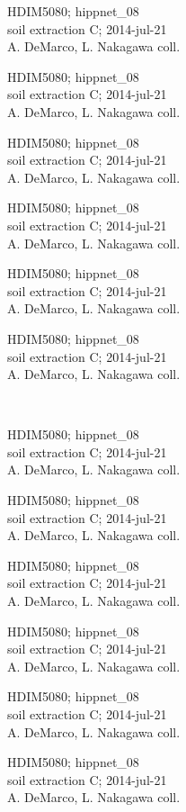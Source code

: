 \documentclass[2pt]{extarticle}
\begin{document}
\noindent
\parbox{0.16\textwidth}{\tiny \raggedright \rule[-0.3\baselineskip]{0pt}{10pt}HDIM5080; hippnet\_08\\ soil extraction C; 2014-jul-21\\ A. DeMarco, L. Nakagawa coll.}
\parbox{0.16\textwidth}{\tiny \raggedright \rule[-0.3\baselineskip]{0pt}{10pt}HDIM5080; hippnet\_08\\ soil extraction C; 2014-jul-21\\ A. DeMarco, L. Nakagawa coll.}
\parbox{0.16\textwidth}{\tiny \raggedright \rule[-0.3\baselineskip]{0pt}{10pt}HDIM5080; hippnet\_08\\ soil extraction C; 2014-jul-21\\ A. DeMarco, L. Nakagawa coll.}
\parbox{0.16\textwidth}{\tiny \raggedright \rule[-0.3\baselineskip]{0pt}{10pt}HDIM5080; hippnet\_08\\ soil extraction C; 2014-jul-21\\ A. DeMarco, L. Nakagawa coll.}
\parbox{0.16\textwidth}{\tiny \raggedright \rule[-0.3\baselineskip]{0pt}{10pt}HDIM5080; hippnet\_08\\ soil extraction C; 2014-jul-21\\ A. DeMarco, L. Nakagawa coll.}
\parbox{0.16\textwidth}{\tiny \raggedright \rule[-0.3\baselineskip]{0pt}{10pt}HDIM5080; hippnet\_08\\ soil extraction C; 2014-jul-21\\ A. DeMarco, L. Nakagawa coll.} \\ 
\vspace{0.001in} 

\noindent
\parbox{0.16\textwidth}{\tiny \raggedright \rule[-0.3\baselineskip]{0pt}{10pt}HDIM5080; hippnet\_08\\ soil extraction C; 2014-jul-21\\ A. DeMarco, L. Nakagawa coll.}
\parbox{0.16\textwidth}{\tiny \raggedright \rule[-0.3\baselineskip]{0pt}{10pt}HDIM5080; hippnet\_08\\ soil extraction C; 2014-jul-21\\ A. DeMarco, L. Nakagawa coll.}
\parbox{0.16\textwidth}{\tiny \raggedright \rule[-0.3\baselineskip]{0pt}{10pt}HDIM5080; hippnet\_08\\ soil extraction C; 2014-jul-21\\ A. DeMarco, L. Nakagawa coll.}
\parbox{0.16\textwidth}{\tiny \raggedright \rule[-0.3\baselineskip]{0pt}{10pt}HDIM5080; hippnet\_08\\ soil extraction C; 2014-jul-21\\ A. DeMarco, L. Nakagawa coll.}
\parbox{0.16\textwidth}{\tiny \raggedright \rule[-0.3\baselineskip]{0pt}{10pt}HDIM5080; hippnet\_08\\ soil extraction C; 2014-jul-21\\ A. DeMarco, L. Nakagawa coll.}
\parbox{0.16\textwidth}{\tiny \raggedright \rule[-0.3\baselineskip]{0pt}{10pt}HDIM5080; hippnet\_08\\ soil extraction C; 2014-jul-21\\ A. DeMarco, L. Nakagawa coll.} \\ 
\vspace{0.001in} 
\end{document}
